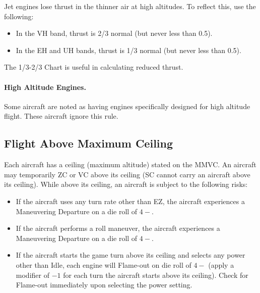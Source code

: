 Jet engines lose thrust in the thinner air at high altitudes. To reflect this, use the following:

\begin{itemize}

    \item In the VH band, thrust is 2/3 normal (but never less than 0.5).

    \item In the EH and UH bands, thrust is 1/3 normal (but never less than 0.5).

\end{itemize}

The 1/3-2/3 Chart is useful in calculating reduced thrust.

\paragraph{High Altitude Engines.} Some aircraft are noted as having engines specifically designed for high altitude flight. These aircraft ignore this rule.

\subsection{Flight Above Maximum Ceiling}

Each aircraft has a ceiling (maximum altitude) stated on the MMVC. An aircraft may temporarily ZC or VC above its ceiling (SC cannot carry an aircraft above its ceiling). While above its ceiling, an aircraft is subject to the following risks:

\begin{itemize}

    \item If the aircraft uses any turn rate other than EZ, the aircraft experiences a Maneuvering Departure on a die roll of $4-$.
    
    \item If the aircraft performs a roll maneuver, the aircraft experiences a Maneuvering Departure on a die roll of $4-$.

    \item If the aircraft starts the game turn above its ceiling and selects any power other than Idle, each engine will Flame-out on die roll of $4-$ (apply a modifier of $-1$ for each turn the aircraft starts above its ceiling). Check for Flame-out immediately upon selecting the power setting.

\end{itemize}

